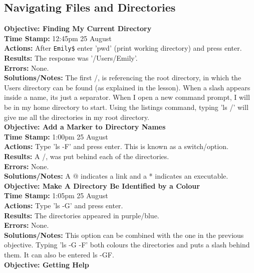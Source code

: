 \documentclass{article}
\begin{document}
\begin{FlushLeft}
\subsection{Navigating Files and Directories}
\textbf{Objective: Finding My Current Directory}\\ 
\textbf{Time Stamp:} 12:45pm 25 August\\
\textbf{Actions:} After \verb|Emily$| enter 'pwd' (print working directory) and press enter.\\
\textbf{Results:} The response was  '/Users/Emily'.\\
\textbf{Errors:} None.\\
\textbf{Solutions/Notes:} The first /, is referencing the root directory, in which the Users directory can be found (as explained in the lesson). When a slash appears inside a name, its just a separator. When I open a new command prompt, I will be in my home directory to start. Using the listings command, typing 'ls /' will give me all the directories in my root directory.\\
\vspace{5mm}
\textbf{Objective: Add a Marker to Directory Names}\\ 
\textbf{Time Stamp:} 1:00pm 25 August\\
\textbf{Actions:} Type 'ls -F' and press enter. This is known as a switch/option.\\
\textbf{Results:} A /, was put behind each of the directories.\\
\textbf{Errors:} None.\\
\textbf{Solutions/Notes:} A @ indicates a link and a * indicates an executable. \\
\vspace{5mm}
\textbf{Objective: Make A Directory Be Identified by a Colour}\\ 
\textbf{Time Stamp:} 1:05pm 25 August\\
\textbf{Actions:} Type 'ls -G' and press enter.\\
\textbf{Results:} The directories appeared in purple/blue. \\
\textbf{Errors:} None.\\
\textbf{Solutions/Notes:} This option can be combined with the one in the previous objective. Typing 'ls -G -F' both colours the directories and puts a slash behind them. It can also be entered ls -GF.\\
\vspace{5mm}
\textbf{Objective: Getting Help}\label{sec:help}\\ 

\end{FlushLeft}
\end{document}
